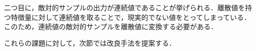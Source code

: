 二つ目に，敵対的サンプルの出力が連続値であることが挙げられる．離散値を持つ特徴量に対して連続値を取ることで，現実的でない値をとってしまっている．このため，連続値の敵対的サンプルを離散値に変換する必要がある．


これらの課題に対して，次節では改良手法を提案する．


